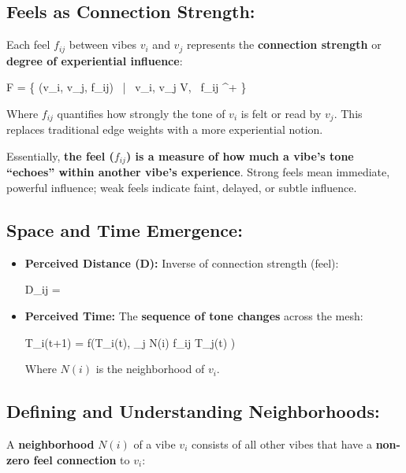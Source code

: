 \documentclass{article}
\let\oldequation\equation
\let\endoldequation\endequation
\renewenvironment{equation}{%
    \noindent\vspace{-\parskip}\vspace{-\baselineskip}%
    \oldequation
}{%
    \endoldequation
    \noindent\vspace{-\parskip}\vspace{-\baselineskip}%
}
\theoremstyle{definition}
\begin{document}
\subsection{Feels as Connection Strength:}

Each feel $f_{ij}$ between vibes $v_i$ and $v_j$ represents the \textbf{connection strength} or \textbf{degree of experiential influence}:

\begin{equation}
F = \{ (v_i, v_j, f_{ij}) \ | \ v_i, v_j \in V, \ f_{ij} \in {}^+ \}
\end{equation}

Where $f_{ij}$ quantifies how strongly the tone of $v_i$ is felt or read by $v_j$. This replaces traditional edge weights with a more experiential notion.

Essentially, \textbf{the feel ($f_{ij}$) is a measure of how much a vibe's tone \enquote{echoes} within another vibe's experience}. Strong feels mean immediate, powerful influence; weak feels indicate faint, delayed, or subtle influence.

\subsection{Space and Time Emergence:}

\begin{itemize}
\item \textbf{Perceived Distance (D):} Inverse of connection strength (feel):

\begin{equation}
D_{ij} = 
\end{equation}

\item \textbf{Perceived Time:} The \textbf{sequence of tone changes} across the mesh:

\begin{equation}
T_i(t+1) = f\left(T_i(t), \sum_{j \in N(i)} f_{ij} \cdot T_j(t) \right)
\end{equation}

Where $N(i)$ is the neighborhood of $v_i$.
\end{itemize}

\subsection{Defining and Understanding Neighborhoods:}

A \textbf{neighborhood} $N(i)$ of a vibe $v_i$ consists of all other vibes that have a \textbf{non-zero feel connection} to $v_i$:
\end{document}

